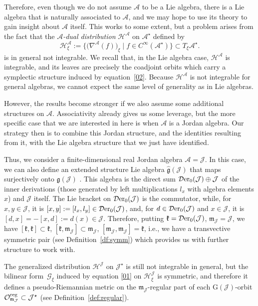 \documentclass[pdftex]{sigma}
\numberwithin{equation}{section}
\newcommand{\hh}{\mathcal{H}}
\newcommand{\Der}{\mathcal{D}{\rm er}}
\newcommand{\ocal}{\mathcal{O}}
\newcommand{\Jcal}{\mathcal{J}}
\newcommand{\m}{\mathfrak{m}}
\newcommand{\G}{\mathrm{G}}
\newcommand{\g}{{\mathfrak{g}}}
\renewcommand{\k}{{\mathfrak k}}
\renewcommand{\m}{{\mathfrak m}}
\newcommand{\cA}{\mathcal{A}}
\newcommand{\Gcal}{\mathcal{G}}
\begin{document}
Therefore, even though we do not assume $\cA$ to be a Lie algebra, there is a Lie algebra that is naturally associated to $\cA$, and we may hope to use its theory to gain insight about $\cA$ itself.
This works to some extent, but a problem arises from the fact that the {\em $\cA$-dual distribution} $\hh^\cA$ on $\cA^\star$ defined by
\[%
\hh^\cA_\xi := \big\{ \big(\nabla^\cA(f)\big)_\xi \mid f \in C^\infty(\cA^\star)\big\} %
\subset T_\xi \cA^\star.
\]
is in general not integrable.
We recall that, in the Lie algebra case, $\hh^\cA$ is integrable, and its leaves are precisely the coadjoint orbits which carry a symplectic structure induced by equation~\eqref{02}.
Because $\hh^\cA$ is not integrable for general algebras, we cannot expect the same level of generality as in Lie algebras.

However, the results become stronger if we also assume some additional structures on $\cA$.
Associativity already gives us some leverage, but the more specific case that we are interested in here is when $\cA$ is a Jordan algebra.
Our strategy then is to combine this Jordan structure, and the identities resulting from it, with the Lie algebra structure that we just have identified.

Thus, we consider a finite-dimensional real Jordan algebra $\cA = \Jcal$.
In this case, we can also define an extended structure Lie algebra $\hat \g(\Jcal)$ that maps surjectively onto $\g(\Jcal)$ \cite{Bertram-2000,Koecher-1999,L-L-2022}.
This algebra is the direct sum $\Der_0(\Jcal) \oplus \Jcal$ of the inner derivations (those generated by left multiplications $l_x$ with algebra elements $x$) and $\Jcal$ itself.
The Lie bracket on $\Der_0(\Jcal)$ is the commutator, while, for $x,y \in \Jcal$, it is $[x,y] := [l_x, l_y] \in \Der_0(\Jcal)$, and, for $d\in \Der_0(\Jcal)$ and $x \in \Jcal$, it is $[d, x] = - [x, d] := d(x) \in
\Jcal$.
Therefore, putting $\k =\Der_0(\Jcal)$, $\m_{\Jcal}= \Jcal$, we have $[\k, \k] \subset \k$, $[\k, \m_{\Jcal}] \subset \m_{\Jcal}$, $[ \m_{\Jcal}, \m_{\Jcal}] = \k$, i.e., we have a transvective symmetric pair (see Definition~\ref{df:symm}) which provides us with further structure to work with.

The generalized distribution $\hh^\Jcal$ on $\Jcal^\star$ is still not integrable in general, but the bilinear form~$\Gcal_\xi$ induced by equation \eqref{01} on $\hh^\Jcal_\xi$ is symmetric, and therefore it defines a pseudo-Riemannian metric on the $ \m_{\Jcal}$-regular part of each $\G(\Jcal)$-orbit $\ocal^{\rm reg}_{\m_{\Jcal}} \subset \Jcal^\star$ (see Definition~\ref{def:regular}).
\end{document}
